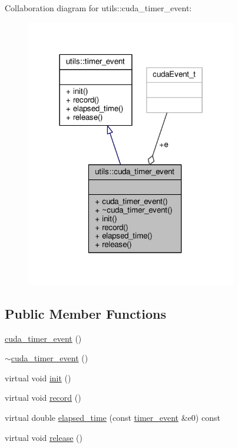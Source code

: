 Collaboration diagram for utils\-:\-:cuda\-\_\-timer\-\_\-event\-:
\nopagebreak
\begin{figure}[H]
\begin{center}
\leavevmode
\includegraphics[width=261pt]{structutils_1_1cuda__timer__event__coll__graph}
\end{center}
\end{figure}
\subsection*{Public Member Functions}
\begin{DoxyCompactItemize}
\item 
\hyperlink{structutils_1_1cuda__timer__event_ac337469a341c5862d300a7d0463cda4b}{cuda\-\_\-timer\-\_\-event} ()
\item 
\hyperlink{structutils_1_1cuda__timer__event_abf0601e8e9d78d34e0303173fee3a227}{$\sim$cuda\-\_\-timer\-\_\-event} ()
\item 
virtual void \hyperlink{structutils_1_1cuda__timer__event_a206eb2f8719df4fa1edcfbfec1ea2c18}{init} ()
\item 
virtual void \hyperlink{structutils_1_1cuda__timer__event_ad7f15ec799ca3909ade273e981bfcc3b}{record} ()
\item 
virtual double \hyperlink{structutils_1_1cuda__timer__event_ae3159d8c207abe1cfbda76215d501a89}{elapsed\-\_\-time} (const \hyperlink{structutils_1_1timer__event}{timer\-\_\-event} \&e0) const 
\item 
virtual void \hyperlink{structutils_1_1cuda__timer__event_a2a2ec069b6be6608afe50f6762f26810}{release} ()
\end{DoxyCompactItemize}

